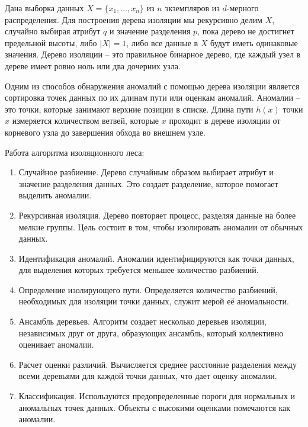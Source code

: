 Дана выборка данных $X = \{x_1, \ldots, x_n\}$ из $n$ экземпляров из $d$-мерного распределения. Для построения дерева изоляции мы рекурсивно делим $X$, случайно выбирая атрибут $q$ и значение разделения $p$, пока дерево не достигнет предельной высоты, либо $|X| = 1$, либо все данные в $X$ будут иметь одинаковые значения. Дерево изоляции -- это правильное бинарное дерево, где каждый узел в дереве имеет ровно ноль или два дочерних узла.

Одним из способов обнаружения аномалий с помощью дерева изоляции является сортировка точек данных по их длинам пути или оценкам аномалий. Аномалии -- это точки, которые занимают верхние позиции в списке. Длина пути $h(x)$ точки $x$ измеряется количеством ветвей, которые $x$ проходит в дереве изоляции от корневого узла до завершения обхода во внешнем узле.

Работа алгоритма изоляционного леса:

\begin{enumerate}[itemindent=2cm, leftmargin=0cm, labelsep=0.3cm, topsep=0cm, itemsep=0cm, parsep=0cm, label=\arabic*., after=\vspace{-0.1cm}, before=\vspace{-0.1cm}]
    \item Случайное разбиение. Дерево случайным образом выбирает атрибут и значение разделения данных. Это создает разделение, которое помогает выделить аномалии.
    \item Рекурсивная изоляция. Дерево повторяет процесс, разделяя данные на более мелкие группы. Цель состоит в том, чтобы изолировать аномалии от обычных данных.
    \item Идентификация аномалий. Аномалии идентифицируются как точки данных, для выделения которых требуется меньшее количество разбиений.
    \item Определение изолирующего пути. Определяется количество разбиений, необходимых для изоляции точки данных, служит мерой её аномальности.
    \item Ансамбль деревьев. Алгоритм создает несколько деревьев изоляции, независимых друг от друга, образующих ансамбль, который коллективно оценивает аномалии.
    \item Расчет оценки различий. Вычисляется среднее расстояние разделения между всеми деревьями для каждой точки данных, что дает оценку аномалии.
    \item Классификация. Используются предопределенные пороги для  нормальных и аномальных точек данных. Объекты с высокими оценками помечаются как аномалии.
\end{enumerate}

